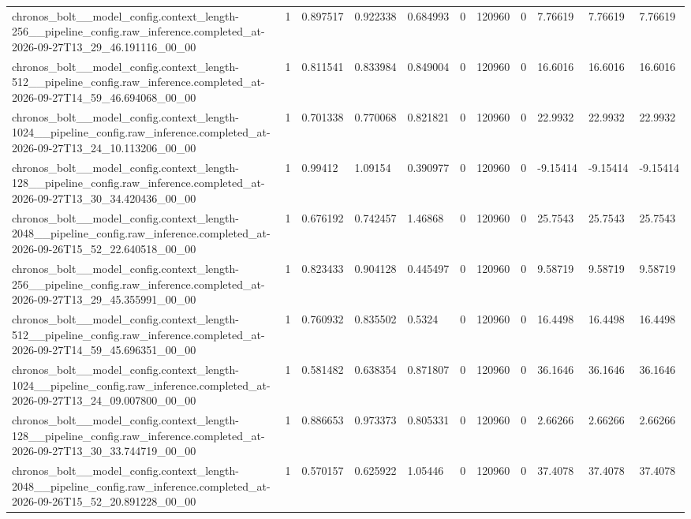 \begin{tabular}{lllllllllll}
chronos\_bolt\_\_model\_config.context\_length-256\_\_pipeline\_config.raw\_inference.completed\_at-2026-09-27T13\_29\_46.191116\_00\_00 & 1 & 0.897517 & 0.922338 & 0.684993 & 0 & 120960 & 0 & 7.76619 & 7.76619 & 7.76619 \\
chronos\_bolt\_\_model\_config.context\_length-512\_\_pipeline\_config.raw\_inference.completed\_at-2026-09-27T14\_59\_46.694068\_00\_00 & 1 & 0.811541 & 0.833984 & 0.849004 & 0 & 120960 & 0 & 16.6016 & 16.6016 & 16.6016 \\
chronos\_bolt\_\_model\_config.context\_length-1024\_\_pipeline\_config.raw\_inference.completed\_at-2026-09-27T13\_24\_10.113206\_00\_00 & 1 & 0.701338 & 0.770068 & 0.821821 & 0 & 120960 & 0 & 22.9932 & 22.9932 & 22.9932 \\
chronos\_bolt\_\_model\_config.context\_length-128\_\_pipeline\_config.raw\_inference.completed\_at-2026-09-27T13\_30\_34.420436\_00\_00 & 1 & 0.99412 & 1.09154 & 0.390977 & 0 & 120960 & 0 & -9.15414 & -9.15414 & -9.15414 \\
chronos\_bolt\_\_model\_config.context\_length-2048\_\_pipeline\_config.raw\_inference.completed\_at-2026-09-26T15\_52\_22.640518\_00\_00 & 1 & 0.676192 & 0.742457 & 1.46868 & 0 & 120960 & 0 & 25.7543 & 25.7543 & 25.7543 \\
chronos\_bolt\_\_model\_config.context\_length-256\_\_pipeline\_config.raw\_inference.completed\_at-2026-09-27T13\_29\_45.355991\_00\_00 & 1 & 0.823433 & 0.904128 & 0.445497 & 0 & 120960 & 0 & 9.58719 & 9.58719 & 9.58719 \\
chronos\_bolt\_\_model\_config.context\_length-512\_\_pipeline\_config.raw\_inference.completed\_at-2026-09-27T14\_59\_45.696351\_00\_00 & 1 & 0.760932 & 0.835502 & 0.5324 & 0 & 120960 & 0 & 16.4498 & 16.4498 & 16.4498 \\
chronos\_bolt\_\_model\_config.context\_length-1024\_\_pipeline\_config.raw\_inference.completed\_at-2026-09-27T13\_24\_09.007800\_00\_00 & 1 & 0.581482 & 0.638354 & 0.871807 & 0 & 120960 & 0 & 36.1646 & 36.1646 & 36.1646 \\
chronos\_bolt\_\_model\_config.context\_length-128\_\_pipeline\_config.raw\_inference.completed\_at-2026-09-27T13\_30\_33.744719\_00\_00 & 1 & 0.886653 & 0.973373 & 0.805331 & 0 & 120960 & 0 & 2.66266 & 2.66266 & 2.66266 \\
chronos\_bolt\_\_model\_config.context\_length-2048\_\_pipeline\_config.raw\_inference.completed\_at-2026-09-26T15\_52\_20.891228\_00\_00 & 1 & 0.570157 & 0.625922 & 1.05446 & 0 & 120960 & 0 & 37.4078 & 37.4078 & 37.4078 \\

\end{tabular}
